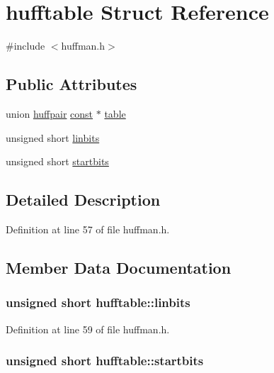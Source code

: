 \hypertarget{structhufftable}{}\section{hufftable Struct Reference}
\label{structhufftable}


{\ttfamily \#include $<$huffman.\+h$>$}

\subsection*{Public Attributes}
\begin{DoxyCompactItemize}
\item 
union \hyperlink{unionhuffpair}{huffpair} \hyperlink{getopt1_8c_a2c212835823e3c54a8ab6d95c652660e}{const} $\ast$ \hyperlink{structhufftable_a375b5d7f480ee73dd16d1933e9ca0128}{table}
\item 
unsigned short \hyperlink{structhufftable_a5c685b75c905924bfaa8ff24af8573f7}{linbits}
\item 
unsigned short \hyperlink{structhufftable_a457eaa23d1e555162af0b16d10e2bd8a}{startbits}
\end{DoxyCompactItemize}


\subsection{Detailed Description}


Definition at line 57 of file huffman.\+h.



\subsection{Member Data Documentation}
\subsubsection[{\texorpdfstring{linbits}{linbits}}]{\setlength{\rightskip}{0pt plus 5cm}unsigned short hufftable\+::linbits}\hypertarget{structhufftable_a5c685b75c905924bfaa8ff24af8573f7}{}\label{structhufftable_a5c685b75c905924bfaa8ff24af8573f7}


Definition at line 59 of file huffman.\+h.

\subsubsection[{\texorpdfstring{startbits}{startbits}}]{\setlength{\rightskip}{0pt plus 5cm}unsigned short hufftable\+::startbits}\hypertarget{structhufftable_a457eaa23d1e555162af0b16d10e2bd8a}{}\label{structhufftable_a457eaa23d1e555162af0b16d10e2bd8a}


